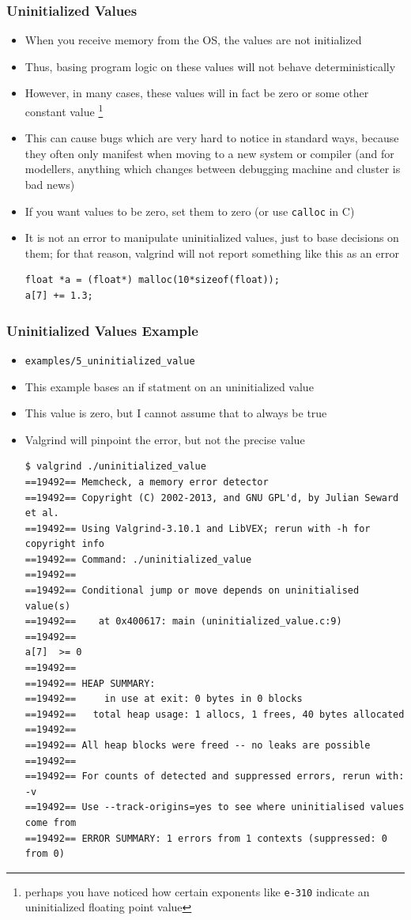 \documentclass{beamer}
\begin{document}
\begin{frame}[fragile]
  \frametitle{Uninitialized Values}
  \begin{itemize}
    \item When you receive memory from the OS, the values are not initialized
      \item Thus, basing program logic on these values will not behave deterministically
      \item However, in many cases, these values will in fact be zero or some other constant value \footnote{perhaps you have noticed how certain exponents like \texttt{e-310} indicate an uninitialized floating point value}
      \item This can cause bugs which are very hard to notice in standard ways, because they often only manifest when moving to a new system or compiler (and for modellers, anything which changes between debugging machine and cluster is bad news)
      \item If you want values to be zero, set them to zero (or use \texttt{calloc} in C)
        \item It is not an error to manipulate uninitialized values, just to base decisions on them; for that reason, valgrind will not report something like this as an error
          \begin{lstlisting}
float *a = (float*) malloc(10*sizeof(float));
a[7] += 1.3;
          \end{lstlisting}
  \end{itemize}
\end{frame}

\begin{frame}[fragile]
\frametitle{Uninitialized Values Example}
\begin{itemize}
\item \texttt{examples/5\_uninitialized\_value}
\item This example bases an if statment on an uninitialized value
\item This value is zero, but I cannot assume that to always be true
\item Valgrind will pinpoint the error, but not the precise value
\begin{lstlisting}
$ valgrind ./uninitialized_value
==19492== Memcheck, a memory error detector
==19492== Copyright (C) 2002-2013, and GNU GPL'd, by Julian Seward et al.
==19492== Using Valgrind-3.10.1 and LibVEX; rerun with -h for copyright info
==19492== Command: ./uninitialized_value
==19492==
==19492== Conditional jump or move depends on uninitialised value(s)
==19492==    at 0x400617: main (uninitialized_value.c:9)
==19492==
a[7]  >= 0
==19492==
==19492== HEAP SUMMARY:
==19492==     in use at exit: 0 bytes in 0 blocks
==19492==   total heap usage: 1 allocs, 1 frees, 40 bytes allocated
==19492==
==19492== All heap blocks were freed -- no leaks are possible
==19492==
==19492== For counts of detected and suppressed errors, rerun with: -v
==19492== Use --track-origins=yes to see where uninitialised values come from
==19492== ERROR SUMMARY: 1 errors from 1 contexts (suppressed: 0 from 0)
\end{lstlisting}
\end{itemize}
\end{frame}
\end{document}
